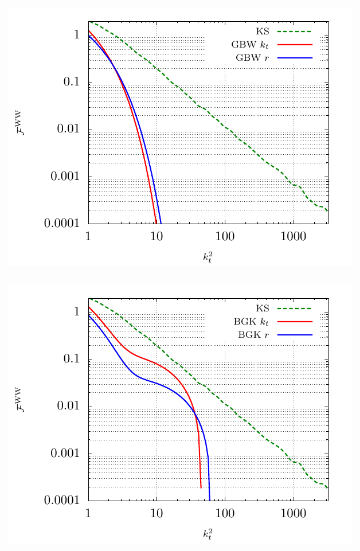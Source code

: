 \documentclass[12pt]{article}
\numberwithin{equation}{section}
\numberwithin{table}{section}
\numberwithin{figure}{section}
\begin{document}
\begin{figure}[t]
    \begin{subfigure}{0.5\textwidth}
        \includegraphics[width=\textwidth]{plots/GBWWW1} 
    \end{subfigure}
    \begin{subfigure}{0.5\textwidth}
        \includegraphics[width=\textwidth]{plots/BGKWW1} 
    \end{subfigure}
    \begin{subfigure}{0.5\textwidth}

\end{subfigure}
\end{figure}
\end{document}
